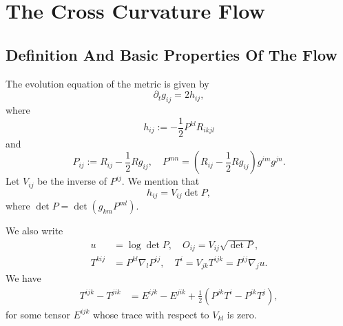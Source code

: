 \documentclass[a4paper, 12pt]{amsart}
\begin{document}
\section{The Cross Curvature Flow}
\label{sec:xcf}

\subsection{Definition And Basic Properties Of  The Flow}
\label{subsec:xcf_defn}

The evolution equation of the metric is given by
\begin{equation}
\partial_tg_{ij}=2h_{ij},
\end{equation}
where
\begin{equation}
h_{ij}:=-\frac{1}{2}P^{kl}R_{ikjl}
\end{equation}
and
\begin{equation}
P_{ij}:=R_{ij}-\frac{1}{2}Rg_{ij},\quad
P^{mn}=\left(R_{ij}-\frac{1}{2}Rg_{ij}\right)g^{im}g^{jn}.
\end{equation}
Let $V_{ij}$ be the inverse of $P^{ij}$. We mention that
\begin{equation}
h_{ij}=V_{ij}\det P,
\end{equation}
where $\det P = \det (g_{km} P^{ml}).$


We also write
\begin{align}
 u&=\log\det P,\quad
O_{ij}=V_{ij}\sqrt{\det P},\\
T^{kij}&=P^{kl}\nabla_l P^{ij},\quad T^i=V_{jk}T^{ijk}=P^{ij}\nabla_ju.
\end{align}
We have
\begin{align}
    T^{ijk}-T^{jik}&=E^{ijk}-E^{jik}+\frac{1}{2}\left(P^{jk}T^i-P^{ik}T^j\right),
\end{align}
for some tensor $E^{ijk}$ whose trace with respect to $V_{kl}$ is zero.
\end{document}

